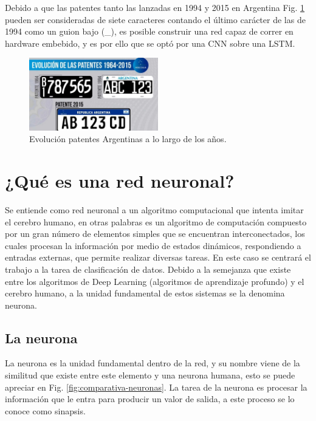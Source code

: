 Debido a que las patentes tanto las lanzadas en 1994 y 2015 en Argentina Fig. \ref{fig:patentes-arg} pueden ser consideradas de siete caracteres contando el último carácter de las de 1994 como un guion bajo (\_), es posible construir una red capaz de correr en hardware embebido, y es por ello que se optó por una CNN sobre una LSTM.

\begin{figure}[h]
    \centering
    \includegraphics[width=0.5\textwidth]{imgs/patentes-arg.png}
    \caption{Evolución patentes Argentinas a lo largo de los años.}
    \label{fig:patentes-arg}
\end{figure}


\section{¿Qué es una red neuronal?}

Se entiende como red neuronal a un algoritmo computacional que intenta imitar el cerebro humano, en otras palabras es un algoritmo de computación compuesto por un gran número de elementos simples que se
encuentran interconectados, los cuales procesan la información por medio de estados dinámicos, respondiendo a entradas externas, que permite realizar diversas tareas.
En este caso se centrará el trabajo a la tarea de clasificación de datos.
Debido a la semejanza que existe entre los algoritmos de Deep Learning \cite{ibm_que_nodate} (algoritmos de aprendizaje profundo) y el cerebro humano, a la unidad fundamental de estos sistemas se la denomina neurona.


\subsection{La neurona}

La neurona es la unidad fundamental dentro de la red, y su nombre viene de la similitud que existe entre este elemento y una neurona humana, esto se puede apreciar en Fig. \ref{fig:comparativa-neuronas}. La tarea de la neurona es procesar la información que le entra para producir un valor de salida, a este proceso se lo conoce como sinapsis.

